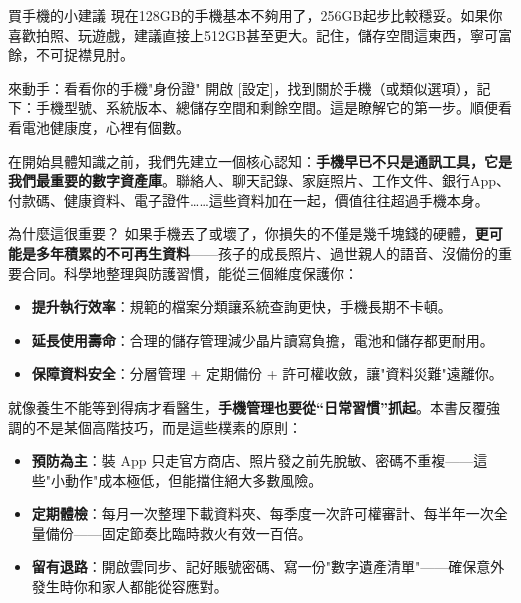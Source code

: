 \begin{tcbinfo}{買手機的小建議}
現在128GB的手機基本不夠用了，256GB起步比較穩妥。如果你喜歡拍照、玩遊戲，建議直接上512GB甚至更大。記住，儲存空間這東西，寧可富餘，不可捉襟見肘。

\end{tcbinfo}

\begin{tcbpractice}{來動手：看看你的手機"身份證"}
開啟 [設定]，找到關於手機（或類似選項），記下：手機型號、系統版本、總儲存空間和剩餘空間。這是瞭解它的第一步。順便看看電池健康度，心裡有個數。

\end{tcbpractice}


在開始具體知識之前，我們先建立一個核心認知：\textbf{手機早已不只是通訊工具，它是我們最重要的數字資產庫}。聯絡人、聊天記錄、家庭照片、工作文件、銀行App、付款碼、健康資料、電子證件……這些資料加在一起，價值往往超過手機本身。

\begin{tcbinfo}{為什麼這很重要？}
如果手機丟了或壞了，你損失的不僅是幾千塊錢的硬體，\textbf{更可能是多年積累的不可再生資料}——孩子的成長照片、過世親人的語音、沒備份的重要合同。科學地整理與防護習慣，能從三個維度保護你：

\begin{itemize}
  \item \textbf{提升執行效率}：規範的檔案分類讓系統查詢更快，手機長期不卡頓。
  \item \textbf{延長使用壽命}：合理的儲存管理減少晶片讀寫負擔，電池和儲存都更耐用。
  \item \textbf{保障資料安全}：分層管理 + 定期備份 + 許可權收斂，讓"資料災難"遠離你。
\end{itemize}

\end{tcbinfo}


就像養生不能等到得病才看醫生，\textbf{手機管理也要從“日常習慣”抓起}。本書反覆強調的不是某個高階技巧，而是這些樸素的原則：

\begin{itemize}
  \item \textbf{預防為主}：裝 App 只走官方商店、照片發之前先脫敏、密碼不重複——這些"小動作"成本極低，但能擋住絕大多數風險。
  \item \textbf{定期體檢}：每月一次整理下載資料夾、每季度一次許可權審計、每半年一次全量備份——固定節奏比臨時救火有效一百倍。
  \item \textbf{留有退路}：開啟雲同步、記好賬號密碼、寫一份"數字遺產清單"——確保意外發生時你和家人都能從容應對。
\end{itemize}
